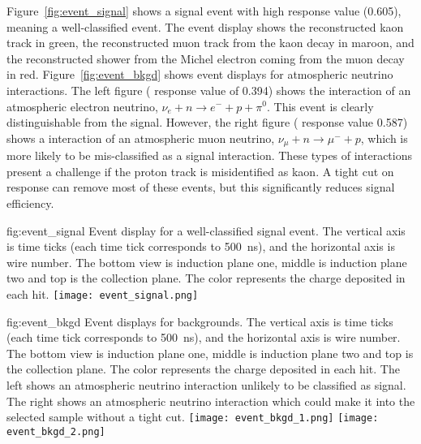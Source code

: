 Figure~\ref{fig:event_signal} shows a signal event with high  response value (\num{0.605}), meaning a well-classified event. The event display shows the reconstructed kaon track in green, the reconstructed muon track from the kaon decay in maroon, and the reconstructed shower from the Michel electron coming from the muon decay in red. Figure~\ref{fig:event_bkgd} shows event displays for atmospheric neutrino interactions.  The left figure ( response value of \num{0.394}) shows the interaction of an atmospheric electron neutrino, $\nu_{e}+n\rightarrow e^{-}+p+\pi^{0}$.  This event is clearly distinguishable from the signal.  However, the right figure ( response value \num{0.587}) shows a  interaction of an atmospheric muon neutrino, $\nu_{\mu}+n \rightarrow \mu^{-}+p$, which is more likely to be mis-classified as a signal interaction. These types of interactions present a challenge if the proton track is misidentified as kaon. A tight cut on  response can remove most of these events, but this significantly reduces signal efficiency.


\begin{dunefigure}
{fig:event_signal}
{Event display for a well-classified \ptoknubar signal event.  The vertical axis is time ticks (each time tick corresponds to \SI{500}{\ns}), and the horizontal axis is wire number. The bottom view is induction plane one, middle is induction plane two and top is the collection plane. The color represents the charge deposited in each hit.}
\texttt{[image: event\_signal.png]}
\end{dunefigure} 

\begin{dunefigure}
{fig:event_bkgd}
{Event displays for \ptoknubar backgrounds.  The vertical axis is time ticks (each time tick corresponds to \SI{500}{\ns}), and the horizontal axis is wire number. The bottom view is induction plane one, middle is induction plane two and top is the collection plane. The color represents the charge deposited in each hit. The left shows an atmospheric neutrino interaction unlikely to be classified as signal. The right shows an atmospheric neutrino interaction which could make it into the selected sample without a tight cut.}
\texttt{[image: event\_bkgd\_1.png]}
\texttt{[image: event\_bkgd\_2.png]}
\end{dunefigure}


